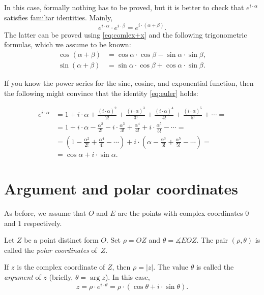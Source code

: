In this case, formally nothing has to be proved,
but it is better to check that $e^{i\cdot\alpha}$ satisfies familiar identities.
Mainly,
$$e^{i\cdot \alpha}\cdot e^{i\cdot \beta}= e^{i\cdot(\alpha+\beta)}.$$
The latter can be proved using \ref{eq:comlex+x} and the following trigonometric formulas,
which we assume to be known:
\begin{align*}
\cos(\alpha+\beta)&=\cos\alpha\cdot\cos\beta-\sin\alpha\cdot\sin\beta,
\\
\sin(\alpha+\beta)&=\sin\alpha\cdot\cos\beta+\cos\alpha\cdot\sin\beta.
\end{align*}

If you know the power series for the sine, cosine, and exponential function, then the following might convince that the identity \ref{eq:euler} holds:

\begin{align*}
 e^{i\cdot \alpha } &{}= 1 + i\cdot \alpha  + \frac{(i\cdot \alpha )^2}{2!} + \frac{(i\cdot \alpha  )^3}{3!} + \frac{(i\cdot \alpha )^4}{4!} + \frac{(i\cdot  \alpha )^5}{5!} +  \cdots =
 \\
&= 1 + i\cdot \alpha  - \frac{\alpha ^2}{2!} - i\cdot\frac{ \alpha ^3}{3!} + \frac{\alpha ^4}{4!} + i\cdot\frac{ \alpha ^5}{5!} -  \cdots =
\\
&= \left( 1 - \frac{\alpha ^2}{2!} + \frac{\alpha ^4}{4!}  - \cdots \right) +  i\cdot\left( \alpha  - \frac{\alpha ^3}{3!} + \frac{\alpha ^5}{5!} -  \cdots \right) =
\\
&= \cos \alpha  +  i\cdot\sin \alpha.
\end{align*}

\section*{Argument and polar coordinates}

As before, we assume that $O$ and $E$ are the points with complex coordinates $0$ and $1$ respectively.

Let $Z$ be a point distinct form $O$.
Set $\rho=OZ$ and $\theta=\measuredangle EOZ$.
The pair $(\rho,\theta)$ is called the \emph{polar coordinates} of~$Z$.

If $z$ is the complex coordinate of $Z$, then $\rho=|z|$. 
The value $\theta$ is called the \emph{argument} of $z$
(briefly, $\theta=\arg z$).
In this case, 
$$z=\rho\cdot e^{i\cdot\theta}=\rho\cdot(\cos\theta+i\cdot\sin\theta).$$

